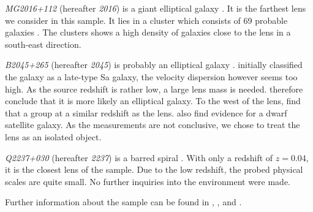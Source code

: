 \documentclass[useAMS,usenatbib]{mn2e}
\begin{document}
\textit{MG2016+112} (hereafter \textit{2016}) is a giant elliptical galaxy \citep{1984Sci...223...46L,1986AJ.....91..991S}. It is the farthest lens we consider in this sample. It lies in a cluster which consists of 69 probable galaxies \citep{2003MNRAS.344..337T}. The clusters shows a high density of galaxies close to the lens in a south-east direction.

\textit{B2045+265} (hereafter \textit{2045}) is probably an elliptical galaxy \citep{2007MNRAS.378..109M}. \cite{1999AJ....117..658F} initially classified the galaxy as a late-type Sa galaxy, the velocity dispersion however seems too high. As the source redshift is rather low, a large lens mass is needed. \cite{2007MNRAS.378..109M} therefore conclude that it is more likely an elliptical galaxy. To the west of the lens, \cite{1999AJ....117..658F} find that a group at a similar redshift as the lens. \cite{2007MNRAS.378..109M} also find evidence for a dwarf satellite galaxy. As the measurements are not conclusive, we chose to treat the lens as an isolated object.

\textit{Q2237+030} (hereafter \textit{2237}) is a barred spiral \citep{1988AJ.....95.1331Y}. With only a redshift of $z=0.04$, it is the closest lens of the sample. Due to the low redshift, the probed physical scales are quite small. No further inquiries into the environment were made.

Further information about the sample can be found in \cite{leier11phd}, \cite{2011ApJ...740...97L}, and \cite{2012A&A...538A..99S}.
\end{document}
